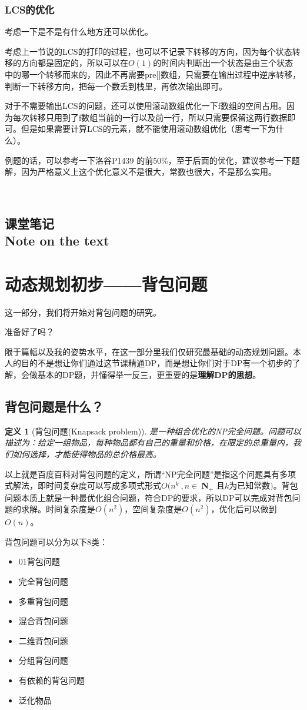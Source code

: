 \documentclass{article}
\newtheorem{definition}{定义}[subsection]
\theoremstyle{nonumberplain}
\newcommand{\note}{\ \par
	\subsection*{课堂笔记\\\tiny{Note on the text}}
	\newpage}
\begin{document}
\subsubsection{LCS的优化}
考虑一下是不是有什么地方还可以优化。

考虑上一节说的LCS的打印的过程，也可以不记录下转移的方向，因为每个状态转移的方向都是固定的，所以可以在$O(1)$的时间内判断出一个状态是由三个状态中的哪一个转移而来的，因此不再需要pre[]数组，只需要在输出过程中逆序转移，判断一下转移方向，把每一个数丢到栈里，再依次输出即可。

对于不需要输出LCS的问题，还可以使用滚动数组优化一下f数组的空间占用。因为每次转移只用到了f数组当前的一行以及前一行，所以只需要保留这两行数据即可。但是如果需要计算LCS的元素，就不能使用滚动数组优化（思考一下为什么）。

例题的话，可以参考一下洛谷P1439 的前50\%，至于后面的优化，建议参考一下题解，因为严格意义上这个优化意义不是很大，常数也很大，不是那么实用。

\note

\newpage
\section{动态规划初步------背包问题}
这一部分，我们将开始对背包问题的研究。

准备好了吗？

限于篇幅以及我的姿势水平，在这一部分里我们仅研究最基础的动态规划问题。本人的目的不是想让你们通过这节课精通DP，而是想让你们对于DP有一个初步的了解，会做基本的DP题，并懂得举一反三，更重要的是\textbf{理解DP的思想}。
\subsection{背包问题是什么？}
\begin{definition}[背包问题(Knapsack problem)]是一种组合优化的NP完全问题。问题可以描述为：给定一组物品，每种物品都有自己的重量和价格，在限定的总重量内，我们如何选择，才能使得物品的总价格最高。
\end{definition}

以上就是百度百科对背包问题的定义，所谓“NP完全问题”是指这个问题具有多项式解法，即时间复杂度可以写成多项式形式$O(n^k\ , n \in\ $\textbf{N}$_+$
且$k$为已知常数$)$。背包问题本质上就是一种最优化组合问题，符合DP的要求，所以DP可以完成对背包问题的求解。时间复杂度是$O(n^2)$，空间复杂度是$O(n^2)$，优化后可以做到$O(n)$。

背包问题可以分为以下8类：
\begin{itemize}
	\item{01背包问题}
	\item{完全背包问题}
	\item{多重背包问题}
	\item{混合背包问题}
	\item{二维背包问题}
	\item{分组背包问题}
	\item{有依赖的背包问题}
	\item{泛化物品}
\end{itemize}
\end{document}
